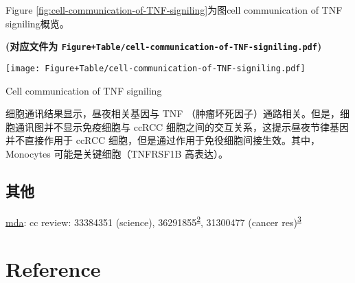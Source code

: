 \documentclass[
]{article}
\begin{document}
Figure \ref{fig:cell-communication-of-TNF-signiling}为图cell communication of TNF signiling概览。

\textbf{(对应文件为 \texttt{Figure+Table/cell-communication-of-TNF-signiling.pdf})}

\def\@captype{figure}
\begin{center}
\texttt{[image: Figure+Table/cell-communication-of-TNF-signiling.pdf]}
\caption{Cell communication of TNF signiling}\label{fig:cell-communication-of-TNF-signiling}
\end{center}

细胞通讯结果显示，昼夜相关基因与 TNF （肿瘤坏死因子）通路相关。但是，细胞通讯图并不显示免疫细胞与 ccRCC 细胞之间的交互关系，这提示昼夜节律基因并不直接作用于 ccRCC 细胞，但是通过作用于免役细胞间接生效。其中，Monocytes 可能是关键细胞（TNFRSF1B 高表达）。

\hypertarget{ux5176ux4ed6}{%
\subsection{其他}\label{ux5176ux4ed6}}

\href{review\%20of\%20EMT,\%20MET\%20or\%20EMP\%5B@EpithelialMeseLuWe2019\%5D}{mda}: cc review: 33384351 (science), 36291855\textsuperscript{\protect\hyperlink{ref-ChronotherapyAmiama2022}{2}}, 31300477 (cancer res)\textsuperscript{\protect\hyperlink{ref-CancerAndTheShafi2019}{3}}

\hypertarget{bibliography}{%
\section*{Reference}\label{bibliography}}
\end{document}

